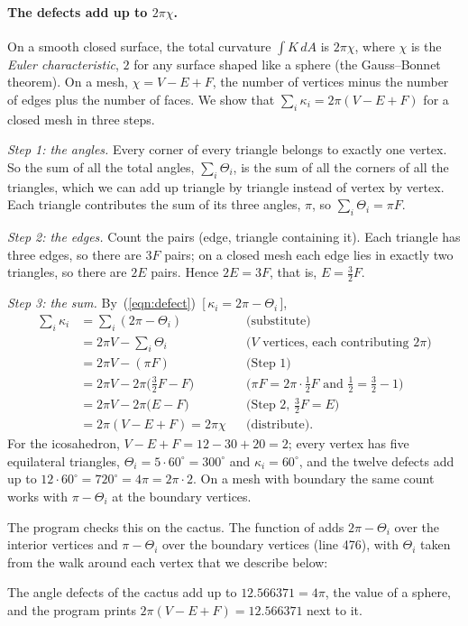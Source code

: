 \paragraph{The defects add up to $2\pi\chi$.} On a smooth closed surface, the total curvature $\int K\, dA$ is $2\pi \chi$, where $\chi$ is the \emph{Euler characteristic}, $2$ for any surface shaped like a sphere (the Gauss--Bonnet theorem). On a mesh, $\chi = V - E + F$, the number of vertices minus the number of edges plus the number of faces. We show that $\sum_i \kappa_i = 2\pi (V - E + F)$ for a closed mesh in three steps.

\emph{Step 1: the angles.} Every corner of every triangle belongs to exactly one vertex. So the sum of all the total angles, $\sum_i \Theta_i$, is the sum of all the corners of all the triangles, which we can add up triangle by triangle instead of vertex by vertex. Each triangle contributes the sum of its three angles, $\pi$, so $\sum_i \Theta_i = \pi F$.

\emph{Step 2: the edges.} Count the pairs (edge, triangle containing it). Each triangle has three edges, so there are $3F$ pairs; on a closed mesh each edge lies in exactly two triangles, so there are $2E$ pairs. Hence $2E = 3F$, that is, $E = \frac32 F$.

\emph{Step 3: the sum.} By~(\ref{eqn:defect})~[\,$\kappa_i = 2\pi - \Theta_i$\,],
\begin{align*}
\sum_i \kappa_i &= \sum_i (2\pi - \Theta_i) && \text{(substitute)} \\
&= 2\pi V - \sum_i \Theta_i && \text{($V$ vertices, each contributing $2\pi$)} \\
&= 2\pi V - (\pi F) && \text{(Step 1)} \\
&= 2\pi V - 2\pi \big(\tfrac32 F - F\big) && \text{($\pi F = 2\pi \cdot \tfrac12 F$ and $\tfrac12 = \tfrac32 - 1$)} \\
&= 2\pi V - 2\pi \big(E - F\big) && \text{(Step 2, $\tfrac32F = E$)} \\
&= 2\pi (V - E + F) = 2\pi\chi && \text{(distribute).}
\end{align*}
For the icosahedron, $V - E + F = 12 - 30 + 20 = 2$; every vertex has five equilateral triangles, $\Theta_i = 5 \cdot 60^\circ = 300^\circ$ and $\kappa_i = 60^\circ$, and the twelve defects add up to $12 \cdot 60^\circ = 720^\circ = 4\pi = 2\pi \cdot 2$. On a mesh with boundary the same count works with $\pi - \Theta_i$ at the boundary vertices.

The program checks this on the cactus. The function  of  adds $2\pi - \Theta_i$ over the interior vertices and $\pi - \Theta_i$ over the boundary vertices (line 476), with $\Theta_i$ taken from the walk around each vertex that we describe below:

The angle defects of the cactus add up to $12.566371 = 4\pi$, the value of a sphere, and the program prints $2\pi(V - E + F) = 12.566371$ next to it.

